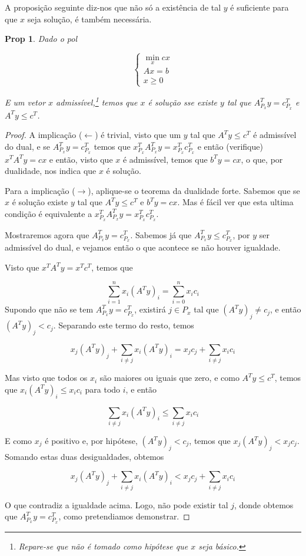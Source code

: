 \documentclass{article}
\newtheorem{prop}{Prop}
\theoremstyle{definition}
\begin{document}
	A proposição seguinte diz-nos que não só a existência de tal $y$ é suficiente para que $x$ seja solução, é também necessária.
	
	\begin{prop}
	Dado o pol
	
	\[
	\begin{cases}
	\min\limits_x cx\\
	Ax = b\\
	x \geq 0
	\end{cases}
	\]
	
	E um vetor $x$ admissível,\footnote{Repare-se que não é tomado como hipótese que $x$ seja básico.} temos que $x$ é solução sse existe $y$ tal que $A_{P_x}^T y = c_{P_x}^T$ e $A^T y \leq c^T$.
	\end{prop}
	
	\begin{proof}
	A implicação ($\leftarrow$) é trivial, visto que um $y$ tal que $A^T y \leq c^T$ é admissível do dual, e se $A_{P_x}^T y = c_{P_x}^T$ temos que $x_{P_x}^T A_{P_x}^T y = x_{P_x}^T c_{P_x}^T$ e então (verifique) $x^T A^T y = cx$ e então, visto que $x$ é admissível, temos que $b^T y = cx$, o que, por dualidade, nos indica que $x$ é solução.
	
	Para a implicação ($\rightarrow$), aplique-se o teorema da dualidade forte. Sabemos que se $x$ é solução existe $y$ tal que $A^T y \leq c^T$ e $b^T y = cx$. Mas é fácil ver que esta ultima condição é equivalente a $x_{P_x}^T A_{P_x}^T y = x_{P_x}^T c_{P_x}^T$.
	
	Mostraremos agora que $A_{P_x}^T y = c_{P_x}^T$. Sabemos já que $A_{P_x}^T y \leq c_{P_x}^T$, por $y$ ser admissível do dual, e vejamos então o que acontece se não houver igualdade.
	
	Visto que $x^T A^T y = x^T c^T$, temos que
	
	\[\sum_{i = 1}^n x_i (A^T y)_i = \sum_{i = 0}^n x_i c_i\]
	Supondo que não se tem $A_{P_x}^T y = c_{P_x}^T$, existirá $j \in P_x$ tal que $(A^T y)_j \neq c_j$, e então $(A^T y)_j < c_j$. Separando este termo do resto, temos
	
	\[x_j (A^T y)_j + \sum_{i \neq j} x_i (A^T y)_i = x_j c_j + \sum_{i \neq j} x_i c_i\]
	
	Mas visto que todos os $x_i$ são maiores ou iguais que zero, e como $A^T y \leq c^T$, temos que $x_i (A^T y)_i \leq x_i c_i$ para todo $i$, e então
	
	\[\sum_{i \neq j} x_i (A^T y)_i \leq \sum_{i \neq j} x_i c_i\]
	
	E como $x_j$ é positivo e, por hipótese, $(A^T y)_j < c_j$, temos que $x_j (A^T y)_j < x_j c_j$. Somando estas duas desigualdades, obtemos
	
	\[x_j (A^T y)_j + \sum_{i \neq j} x_i (A^T y)_i < x_j c_j + \sum_{i \neq j} x_i c_i\]
	
	O que contradiz a igualdade acima. Logo, não pode existir tal $j$, donde obtemos que $A_{P_x}^T y = c_{P_x}^T$, como pretendiamos demonstrar.
	\end{proof}
	
\end{document}
